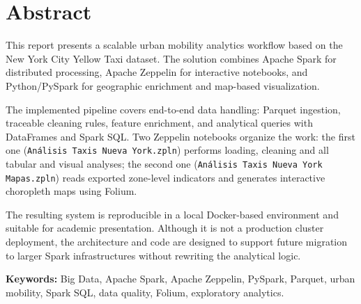 \chapter*{Abstract}
This report presents a scalable urban mobility analytics workflow based on the
New York City Yellow Taxi dataset. The solution combines Apache Spark for distributed
processing, Apache Zeppelin for interactive notebooks, and Python/PySpark for
geographic enrichment and map-based visualization.

The implemented pipeline covers end-to-end data handling: Parquet ingestion,
traceable cleaning rules, feature enrichment, and analytical queries with DataFrames
and Spark SQL. Two Zeppelin notebooks organize the work: the first one
(\texttt{Análisis Taxis Nueva York.zpln}) performs loading, cleaning and all
tabular and visual analyses; the second one
(\texttt{Análisis Taxis Nueva York Mapas.zpln}) reads exported zone-level indicators
and generates interactive choropleth maps using Folium.

The resulting system is reproducible in a local Docker-based environment and suitable
for academic presentation. Although it is not a production cluster deployment, the
architecture and code are designed to support future migration to larger Spark
infrastructures without rewriting the analytical logic.

\vspace{.5cm}

\textbf{Keywords:} Big Data, Apache Spark, Apache Zeppelin, PySpark, Parquet,
urban mobility, Spark SQL, data quality, Folium, exploratory analytics.
